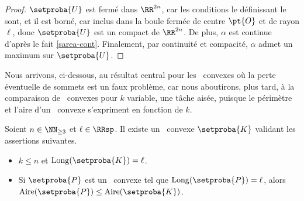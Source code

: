 \begin{proof}
     $\setproba{U}$ est fermé dans $\RR^{2n}$, car les conditions le définissant le sont, et il est borné, car inclus dans la boule fermée de centre $\pt{O}$ et de rayon $\ell$,
     donc $\setproba{U}$ est un compact de $\RR^{2n}$.
     De plus, $\alpha$ est continue d'après le fait \ref{sarea-cont}.
     Finalement, par continuité et compacité, $\alpha$ admet un maximum sur $\setproba{U}$.
\end{proof}




Nous arrivons, ci-dessous, au résultat central pour les \ngones\ convexes où la perte éventuelle de sommets est un faux problème, car nous aboutirons, plus tard, à la comparaison de \kregs\ convexes pour $k$ variable, une tâche aisée, puisque le périmètre et l'aire d'un \kreg\ convexe s'expriment en fonction de $k$.


\begin{fact} \label{at-least-one-kgone}
    Soient $n \in \NN_{\geq3}$ et $\ell \in \RRsp$.
    Il existe un \kgone\ convexe $\setproba{K}$ validant les assertions suivantes.
	\begin{itemize}
		\item $k \leq n$ et $\cyclelen{\setproba{K}} = \ell$.

		\item Si $\setproba{P}$ est un \ngone\ convexe tel que $\cyclelen{\setproba{P}} = \ell$, alors $\area{\setproba{P}} \leq \area{\setproba{K}}$.
    \end{itemize}
\end{fact}


